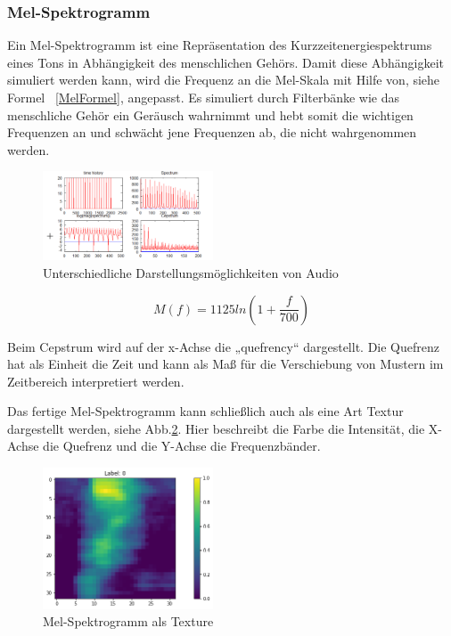 \documentclass[sigconf]{acmart}
\begin{document}
\subsubsection{Mel-Spektrogramm\\}
Ein Mel-Spektrogramm ist eine Repräsentation des Kurzzeitenergiespektrums eines Tons in Abhängigkeit des menschlichen Gehörs. Damit diese Abhängigkeit simuliert werden kann, wird die Frequenz an die Mel-Skala\cite{ganchev2005comparative} mit Hilfe von, siehe Formel ~\ref{MelFormel}, angepasst. Es simuliert durch Filterbänke wie das menschliche Gehör ein Geräusch wahrnimmt und hebt somit die wichtigen Frequenzen an und schwächt jene Frequenzen ab, die nicht wahrgenommen werden. 
\begin{figure}[ht]
  \includegraphics[width=0.45\textwidth]{images/melexplanation}
  \caption{Unterschiedliche Darstellungsmöglichkeiten von Audio}
  \Description{}
  \label{fig:TrainingsDaten}
\end{figure}

\newpage
\begin{equation}\label{MelFormel}
M(f)=1125ln(1+\frac{f}{700})
\end{equation}

Beim Cepstrum wird auf der x-Achse die „quefrency“ dargestellt. Die Quefrenz hat als Einheit die Zeit und kann als Maß für die Verschiebung von Mustern im Zeitbereich interpretiert werden. 

Das fertige Mel-Spektrogramm kann schließlich auch als eine Art Textur dargestellt werden, siehe Abb.\ref{fig:MelTextur}.  
Hier beschreibt die Farbe die Intensität, die X-Achse die Quefrenz und die Y-Achse die Frequenzbänder. 
\begin{figure}[ht]
  \includegraphics[width=0.45\textwidth]{images/Mel}
  \caption{Mel-Spektrogramm als Texture}
  \Description{}
  \label{fig:MelTextur}
\end{figure}
\end{document}
